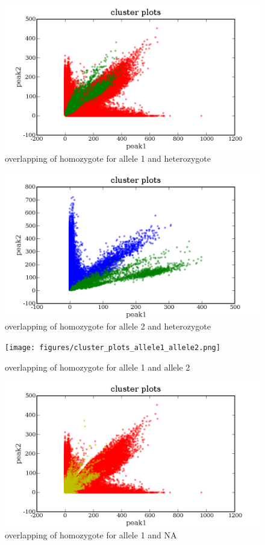 \documentclass[a4paper,10pt]{article}
\begin{document}
\begin{figure}
\includegraphics[width=1\textwidth]{figures/cluster_plots_allele1_het.png}
\caption{overlapping of homozygote for allele 1 and heterozygote}\label{f5}
\end{figure}

\begin{figure}
\includegraphics[width=1\textwidth]{figures/cluster_plots_allele2_het.png}
\caption{overlapping of homozygote for allele 2 and heterozygote}\label{f6}
\end{figure}

\begin{figure}
\texttt{[image: figures/cluster\_plots\_allele1\_allele2.png]}
\caption{overlapping of homozygote for allele 1 and allele 2}\label{f7}
\end{figure}

\begin{figure}
\includegraphics[width=1\textwidth]{figures/cluster_plots_allele1_NA.png}
\caption{overlapping of homozygote for allele 1 and NA}\label{f8}
\end{figure}
\end{document}
